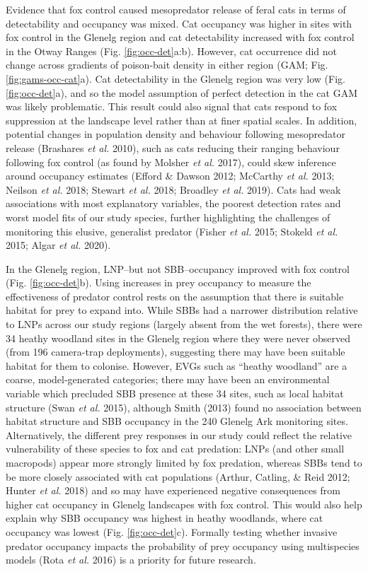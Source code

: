 \documentclass[]{elsarticle} %
\begin{document}
Evidence that fox control caused mesopredator release of feral cats in terms of detectability and occupancy was mixed. Cat occupancy was higher in sites with fox control in the Glenelg region and cat detectability increased with fox control in the Otway Ranges (Fig. \ref{fig:occ-det}a:b). However, cat occurrence did not change across gradients of poison-bait density in either region (GAM; Fig. \ref{fig:gams-occ-cat}a). Cat detectability in the Glenelg region was very low (Fig. \ref{fig:occ-det}a), and so the model assumption of perfect detection in the cat GAM was likely problematic. This result could also signal that cats respond to fox suppression at the landscape level rather than at finer spatial scales. In addition, potential changes in population density and behaviour following mesopredator release (Brashares \emph{et al.} 2010), such as cats reducing their ranging behaviour following fox control (as found by Molsher \emph{et al.} 2017), could skew inference around occupancy estimates (Efford \& Dawson 2012; McCarthy \emph{et al.} 2013; Neilson \emph{et al.} 2018; Stewart \emph{et al.} 2018; Broadley \emph{et al.} 2019). Cats had weak associations with most explanatory variables, the poorest detection rates and worst model fits of our study species, further highlighting the challenges of monitoring this elusive, generalist predator (Fisher \emph{et al.} 2015; Stokeld \emph{et al.} 2015; Algar \emph{et al.} 2020).

In the Glenelg region, LNP--but not SBB--occupancy improved with fox control (Fig. \ref{fig:occ-det}b). Using increases in prey occupancy to measure the effectiveness of predator control rests on the assumption that there is suitable habitat for prey to expand into. While SBBs had a narrower distribution relative to LNPs across our study regions (largely absent from the wet forests), there were 34 heathy woodland sites in the Glenelg region where they were never observed (from 196 camera-trap deployments), suggesting there may have been suitable habitat for them to colonise. However, EVGs such as ``heathy woodland'' are a coarse, model-generated categories; there may have been an environmental variable which precluded SBB presence at these 34 sites, such as local habitat structure (Swan \emph{et al.} 2015), although Smith (2013) found no association between habitat structure and SBB occupancy in the 240 Glenelg Ark monitoring sites. Alternatively, the different prey responses in our study could reflect the relative vulnerability of these species to fox and cat predation: LNPs (and other small macropods) appear more strongly limited by fox predation, whereas SBBs tend to be more closely associated with cat populations (Arthur, Catling, \& Reid 2012; Hunter \emph{et al.} 2018) and so may have experienced negative consequences from higher cat occupancy in Glenelg landscapes with fox control. This would also help explain why SBB occupancy was highest in heathy woodlands, where cat occupancy was lowest (Fig. \ref{fig:occ-det}c). Formally testing whether invasive predator occupancy impacts the probability of prey occupancy using multispecies models (Rota \emph{et al.} 2016) is a priority for future research.
\end{document}
